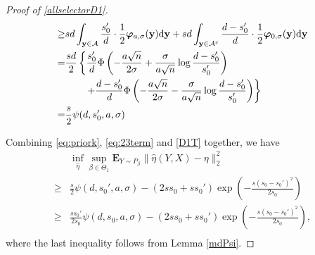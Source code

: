 \documentclass[12pt]{article}
\newtheorem{proof}{Proof}
\begin{document}
\begin{appendix}
\begin{proof}[Proof of \eqref{allselectorD1}]
\begin{equation}
\begin{aligned}
\ge&sd \int_{{\bf y}\in \mathcal A} \frac{s_0'}{d} \cdot \frac12 \boldsymbol \varphi_{a,\sigma}({\bf y})\mathrm d {\bf y}
    +sd \int_{{\bf y}\in \mathcal A^c} \frac{d-s_0'}{d} \cdot\frac12 \boldsymbol \varphi_{0,\sigma}({\bf y})\mathrm d {\bf y}\\
=& \frac{sd}{2} \left\{ \frac{s_0'}{d} {\Phi}\left(-\frac{a \sqrt n}{2\sigma}+\frac{\sigma}{a\sqrt n} \log\frac{d-s_0'}{s_0'}\right) \right.\\
  &\qquad \left.  + \frac{d-s_0'}{d} {\Phi}\left(-\frac{a \sqrt n}{2\sigma}-\frac{\sigma}{a\sqrt n} \log\frac{d-s_0'}{s_0'}\right) \right\}\\
=& \frac{s}{2} \psi(d, s_0', a, \sigma)
\end{aligned}
\end{equation}

Combining \eqref{eq:priork}, \eqref{eq:23term} and \eqref{D1T} together, we have
\begin{equation}\label{Theta1}
\begin{aligned}
& \inf_{\hat \eta} \sup_{\beta \in {\Theta}_1} \mathbf{E}_{Y\sim P_\beta} \| \hat \eta(Y,X) - \eta \|_2^2 \\
\ge& \frac{s}{2} \psi(d, s_0', a, \sigma) 
    -(2s s_0+ ss_0') \exp\left(-\frac{s(s_0-s_0')^2}{2s_0}\right)\\
{\ge}& \frac{ss_0'}{2s_0}\psi(d, s_0, a, \sigma) 
    -(2s s_0+ ss_0') \exp\left(-\frac{s(s_0-s_0')^2}{2s_0}\right), \\
\end{aligned}
\end{equation}
where the last inequality follows from Lemma \ref{mdPsi}.
\end{proof}


\end{appendix}
\end{document}
